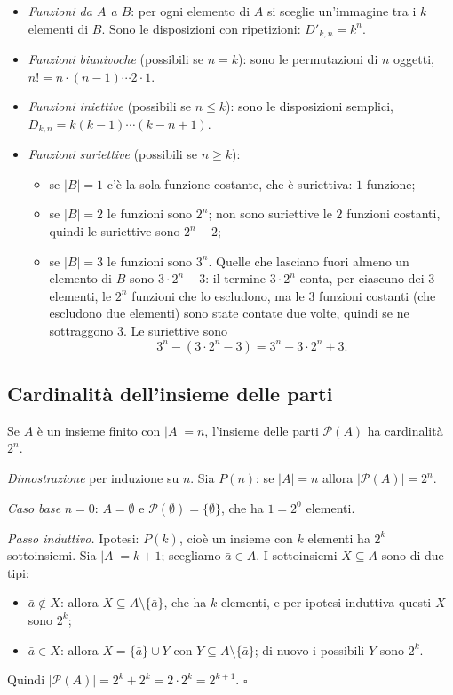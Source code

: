 \documentclass[11pt,a4paper]{article}
\begin{document}
\begin{itemize}
    \item \emph{Funzioni da $A$ a $B$}: per ogni elemento di $A$ si sceglie un'immagine tra i $k$ elementi di $B$. Sono le disposizioni con ripetizioni: $D'_{k,n} = k^n$.
    \item \emph{Funzioni biunivoche} (possibili se $n = k$): sono le permutazioni di $n$ oggetti, $n! = n \cdot (n-1) \cdots 2 \cdot 1$.
    \item \emph{Funzioni iniettive} (possibili se $n \le k$): sono le disposizioni semplici, $D_{k,n} = k(k-1)\cdots(k-n+1)$.
    \item \emph{Funzioni suriettive} (possibili se $n \ge k$):
    \begin{itemize}
        \item se $|B| = 1$ c'è la sola funzione costante, che è suriettiva: $1$ funzione;
        \item se $|B| = 2$ le funzioni sono $2^n$; non sono suriettive le $2$ funzioni costanti, quindi le suriettive sono $2^n - 2$;
        \item se $|B| = 3$ le funzioni sono $3^n$. Quelle che lasciano fuori almeno un elemento di $B$ sono $3 \cdot 2^n - 3$: il termine $3 \cdot 2^n$ conta, per ciascuno dei $3$ elementi, le $2^n$ funzioni che lo escludono, ma le $3$ funzioni costanti (che escludono due elementi) sono state contate due volte, quindi se ne sottraggono $3$. Le suriettive sono
        \[
        3^n - (3 \cdot 2^n - 3) = 3^n - 3 \cdot 2^n + 3.
        \]
    \end{itemize}
\end{itemize}

\subsection{Cardinalità dell'insieme delle parti}

\begin{proposizione}
Se $A$ è un insieme finito con $|A| = n$, l'insieme delle parti $\mathcal{P}(A)$ ha cardinalità $2^n$.
\end{proposizione}

\emph{Dimostrazione} per induzione su $n$. Sia $P(n)$: se $|A| = n$ allora $|\mathcal{P}(A)| = 2^n$.

\emph{Caso base} $n = 0$: $A = \emptyset$ e $\mathcal{P}(\emptyset) = \{\emptyset\}$, che ha $1 = 2^0$ elementi.

\emph{Passo induttivo.} Ipotesi: $P(k)$, cioè un insieme con $k$ elementi ha $2^k$ sottoinsiemi. Sia $|A| = k + 1$; scegliamo $\bar a \in A$. I sottoinsiemi $X \subseteq A$ sono di due tipi:
\begin{itemize}
    \item $\bar a \notin X$: allora $X \subseteq A \setminus \{\bar a\}$, che ha $k$ elementi, e per ipotesi induttiva questi $X$ sono $2^k$;
    \item $\bar a \in X$: allora $X = \{\bar a\} \cup Y$ con $Y \subseteq A \setminus \{\bar a\}$; di nuovo i possibili $Y$ sono $2^k$.
\end{itemize}
Quindi $|\mathcal{P}(A)| = 2^k + 2^k = 2 \cdot 2^k = 2^{k+1}$. \hfill $\square$
\end{document}
